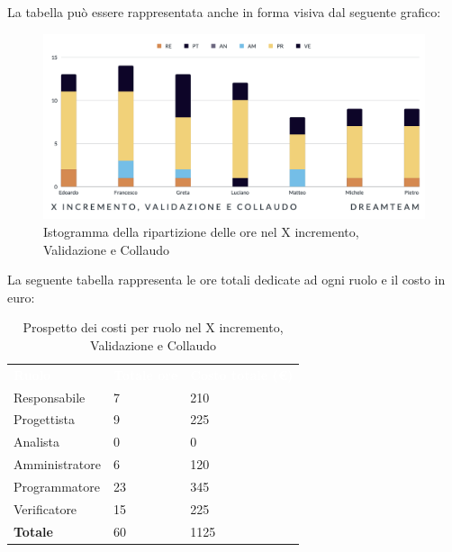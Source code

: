 La tabella può essere rappresentata anche in forma visiva dal seguente grafico:
\begin{figure}[H]
\centering
\includegraphics[scale=0.55]{Sezioni/SezioniPreventivo/grafici/Preventivo_validazione_collaudo_X.png}
\caption{Istogramma della ripartizione delle ore nel X incremento, Validazione e Collaudo}
\end{figure}

La seguente tabella rappresenta le ore totali dedicate ad ogni ruolo e il costo in euro:

\begin{table}[H]
\begin{center}
\renewcommand{\arraystretch}{1.5}
\begin{tabular}{ m{}<{\centering}  m{}<{\centering} m{}<{\centering}}
	\rowcolor{darkblue}
	\textcolor{white}{\textbf{Ruolo}}&\textcolor{white}{\textbf{Totale ore}}&\textcolor{white}{\textbf{Costo totale (\euro)}}\\ 

	Responsabile  & 7 & 210 \\	
	
	Progettista & 9 & 225 \\
	
	Analista & 0 & 0 \\

	Amministratore & 6 & 120 \\
	
	Programmatore & 23 & 345 \\
	
	Verificatore & 15 & 225 \\
	
	\textbf{Totale} & 60 & 1125 \\
	
\end{tabular}
\caption{Prospetto dei costi per ruolo nel X incremento, Validazione e Collaudo}
\end{center}
\end{table}

